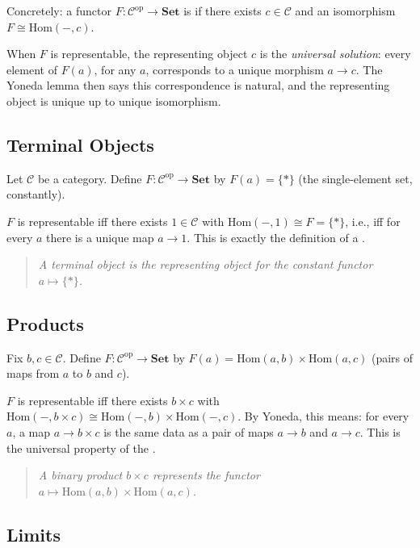 Concretely: a functor $F : \mathcal{C}^{\mathrm{op}} \to \mathbf{Set}$ is
 if there exists $c \in \mathcal{C}$ and an isomorphism
$F \cong \mathrm{Hom}(-, c)$.

When $F$ is representable, the representing object $c$ is the
\emph{universal solution}: every element of $F(a)$, for any $a$,
corresponds to a unique morphism $a \to c$. The Yoneda lemma then says
this correspondence is natural, and the representing object is unique up
to unique isomorphism.

\subsection{Terminal Objects}

Let $\mathcal{C}$ be a category. Define $F : \mathcal{C}^{\mathrm{op}} \to
\mathbf{Set}$ by $F(a) = \{*\}$ (the single-element set, constantly).

$F$ is representable iff there exists $1 \in \mathcal{C}$ with
$\mathrm{Hom}(-, 1) \cong F = \{*\}$, i.e., iff for every $a$ there is
a unique map $a \to 1$. This is exactly the definition of a
.

\begin{quote}
\emph{A terminal object is the representing object for the constant functor
$a \mapsto \{*\}$.}
\end{quote}

\subsection{Products}

Fix $b, c \in \mathcal{C}$. Define $F : \mathcal{C}^{\mathrm{op}} \to
\mathbf{Set}$ by $F(a) = \mathrm{Hom}(a, b) \times \mathrm{Hom}(a, c)$
(pairs of maps from $a$ to $b$ and $c$).

$F$ is representable iff there exists $b \times c$ with
$\mathrm{Hom}(-, b \times c) \cong \mathrm{Hom}(-, b) \times \mathrm{Hom}(-,c)$.
By Yoneda, this means: for every $a$, a map $a \to b \times c$ is the
same data as a pair of maps $a \to b$ and $a \to c$. This is the
universal property of the .

\begin{quote}
\emph{A binary product $b \times c$ represents the functor $a \mapsto
\mathrm{Hom}(a, b) \times \mathrm{Hom}(a, c)$.}
\end{quote}

\subsection{Limits}

